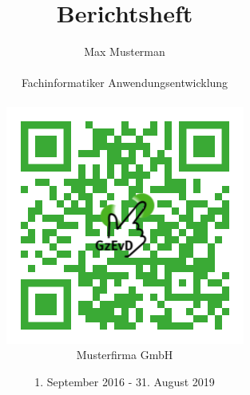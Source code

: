 \documentclass[
11pt,
a4paper,
headsepline=on,
footsepline=on,
headheight=3em,
footheight=1em
]{scrartcl}
\begin{document}
\title{Berichtsheft}
\author{%
  Max Musterman\\
  \\
  Fachinformatiker Anwendungsentwicklung\\
  \\
  \includegraphics[scale=0.75]{qr-code.png}\\
  Musterfirma GmbH%
}
\date{1. September 2016 - 31. August 2019}
\maketitle

\newpage

\tableofcontents

\newpage




\end{document}
